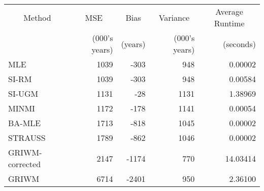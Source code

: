 
\begin{tabular}{lrrrr}
\toprule
\multicolumn{1}{c}{Method} & \multicolumn{1}{c}{MSE} & \multicolumn{1}{c}{Bias} & \multicolumn{1}{c}{Variance} & \multicolumn{1}{c}{Average Runtime} \\
\cmidrule(l{3pt}r{3pt}){1-1} \cmidrule(l{3pt}r{3pt}){2-2} \cmidrule(l{3pt}r{3pt}){3-3} \cmidrule(l{3pt}r{3pt}){4-4} \cmidrule(l{3pt}r{3pt}){5-5}
 & (000's years) & (years) & (000's years) & (seconds)\\
\midrule
MLE & 1039 & -303 & 948 & 0.00002\\
SI-RM & 1039 & -303 & 948 & 0.00584\\
SI-UGM & 1131 & -28 & 1131 & 1.38969\\
MINMI & 1172 & -178 & 1141 & 0.00054\\
BA-MLE & 1713 & -818 & 1045 & 0.00002\\
\addlinespace
STRAUSS & 1789 & -862 & 1046 & 0.00002\\
GRIWM-corrected & 2147 & -1174 & 770 & 14.03414\\
GRIWM & 6714 & -2401 & 950 & 2.36100\\
\bottomrule
\end{tabular}
